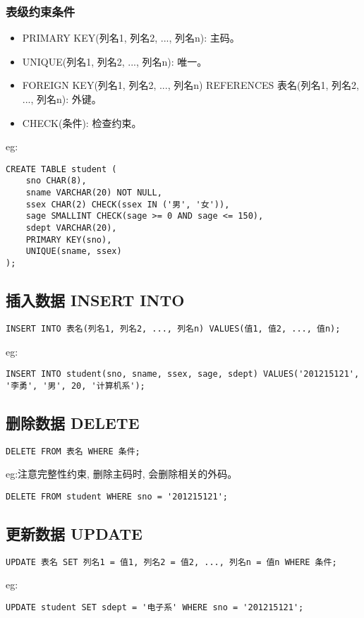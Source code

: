 \subsubsection{表级约束条件}
\begin{itemize}
    \item PRIMARY KEY(列名1, 列名2, ..., 列名n): 主码。
    \item UNIQUE(列名1, 列名2, ..., 列名n): 唯一。
    \item FOREIGN KEY(列名1, 列名2, ..., 列名n) REFERENCES 表名(列名1, 列名2, ..., 列名n): 外键。
    \item CHECK(条件): 检查约束。
\end{itemize}
eg:
\begin{lstlisting}
CREATE TABLE student (
    sno CHAR(8),
    sname VARCHAR(20) NOT NULL,
    ssex CHAR(2) CHECK(ssex IN ('男', '女')),
    sage SMALLINT CHECK(sage >= 0 AND sage <= 150),
    sdept VARCHAR(20),
    PRIMARY KEY(sno),
    UNIQUE(sname, ssex)
);
\end{lstlisting}
\subsection{插入数据 INSERT INTO}
\begin{lstlisting}
INSERT INTO 表名(列名1, 列名2, ..., 列名n) VALUES(值1, 值2, ..., 值n);
\end{lstlisting}
eg:
\begin{lstlisting}
INSERT INTO student(sno, sname, ssex, sage, sdept) VALUES('201215121', '李勇', '男', 20, '计算机系');
\end{lstlisting}
\subsection{删除数据 DELETE}
\begin{lstlisting}
DELETE FROM 表名 WHERE 条件;
\end{lstlisting}
eg:注意完整性约束, 删除主码时, 会删除相关的外码。
\begin{lstlisting}
DELETE FROM student WHERE sno = '201215121';
\end{lstlisting}
\subsection{更新数据 UPDATE}
\begin{lstlisting}
UPDATE 表名 SET 列名1 = 值1, 列名2 = 值2, ..., 列名n = 值n WHERE 条件;
\end{lstlisting}
eg:
\begin{lstlisting}
UPDATE student SET sdept = '电子系' WHERE sno = '201215121';
\end{lstlisting}
